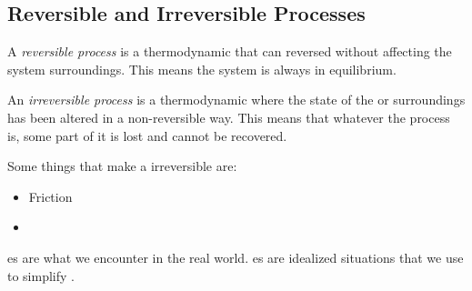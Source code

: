 \subsection{Reversible and Irreversible Processes}\label{subsec:Reversible_Irreversible_Processes}
\begin{definition}\label{def:Reversible_Process}
  A \emph{reversible process} is a thermodynamic  that can reversed without affecting the system surroundings.
  This means the system is always in equilibrium.
\end{definition}

\begin{definition}\label{def:Irreversible_Process}
  An \emph{irreversible process} is a thermodynamic  where the state of the  or surroundings has been altered in a non-reversible way.
  This means that whatever the process is, some part of it is lost and cannot be recovered.
\end{definition}

Some things that make a  irreversible are:
\begin{itemize}[noitemsep]
\item Friction
\item {}
\end{itemize}

\begin{blackbox}
  es are what we encounter in the real world.
  es are idealized situations that we use to simplify .
\end{blackbox}


